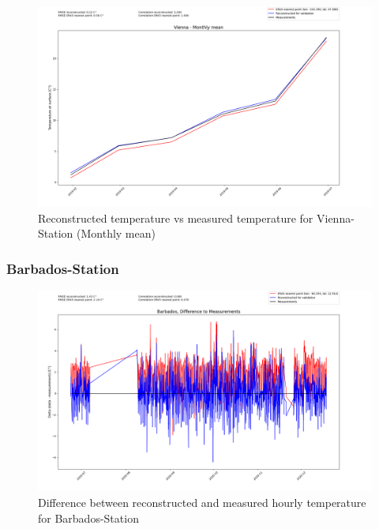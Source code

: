 \begin{figure}
    \centering
    \includegraphics[width=1.02\textwidth]{resources/images/charts/vienna_eval_grib_final/Vienna - Monthly mean.png}
    \caption{Reconstructed temperature vs measured temperature for Vienna-Station (Monthly mean)}
\end{figure}

\newpage

\subsubsection*{Barbados-Station}

\begin{figure}[H]
    \centering
    \includegraphics[width=1.02\textwidth]{resources/images/charts/barbados_eval_grib_final/Barbados, Difference to Measurements.png}
    \caption{Difference between reconstructed and measured hourly temperature for Barbados-Station}
\end{figure}

